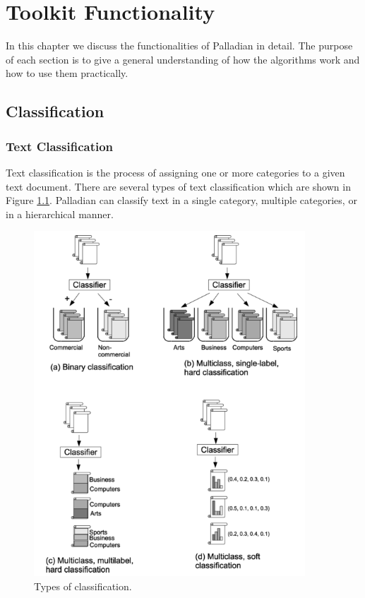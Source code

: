 \documentclass[a4paper,twoside]{book}      %
\begin{document}
\chapter{Toolkit Functionality}
In this chapter we discuss the functionalities of Palladian in detail. The purpose of each section is to give a general understanding of how the algorithms work and how to use them practically.

\section{Classification}

\subsection{Text Classification}
Text classification is the process of assigning one or more categories to a given text document. There are several types of text classification which are shown in Figure \ref{fig:typesOfClassification}. Palladian can classify text in a single category, multiple categories, or in a hierarchical manner.

\begin{figure}[ht!]
\centering
\includegraphics[width=4in]{img/typesOfClassification.png}
\caption{Types of classification\cite{qi2009web}.}
\label{fig:typesOfClassification}
\end{figure}
\end{document}
